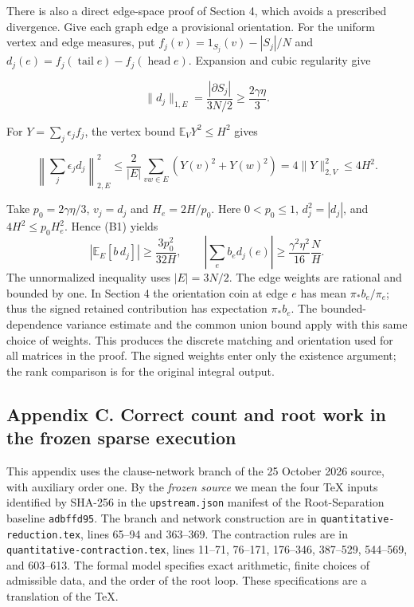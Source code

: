 \documentclass[
  11pt,
]{article}
\begin{document}
There is also a direct edge-space proof of Section 4, which avoids a
prescribed divergence. Give each graph edge a provisional orientation.
For the uniform vertex and edge measures, put
\(f_j(v)=1_{S_j}(v)-|S_j|/N\) and
\(d_j(e)=f_j(\operatorname{tail}e)-f_j(\operatorname{head}e)\).
Expansion and cubic regularity give

\[
\|d_j\|_{1,E}=\frac{|\partial S_j|}{3N/2}\ge\frac{2\gamma\eta}{3}.
\]

For \(Y=\sum_j\epsilon_jf_j\), the vertex bound
\(\mathbb E_VY^2\le H^2\) gives

\[
\left\|\sum_j\epsilon_jd_j\right\|_{2,E}^2
\le\frac{2}{|E|}\sum_{vw\in E}(Y(v)^2+Y(w)^2)
=4\|Y\|_{2,V}^2\le4H^2.
\]

Take \(p_0=2\gamma\eta/3\), \(v_j=d_j\) and \(H_e=2H/p_0\).
Here \(0<p_0\le1\), \(d_j^2=|d_j|\), and
\(4H^2\le p_0 H_e^2\). Hence (B1) yields
\[
 |\mathbb E_E[b\,d_j]|\ge \frac{3p_0^2}{32H},\qquad
 \left|\sum_e b_e d_j(e)\right|\ge
       \frac{\gamma^2\eta^2}{16}\frac{N}{H}.                 \tag{B2}
\]
The unnormalized inequality uses \(|E|=3N/2\). The edge
weights are rational and bounded by one. In Section 4 the orientation
coin at edge \(e\) has mean \(\pi_* b_e/\pi_e\); thus the signed retained
contribution has expectation \(\pi_* b_e\). The bounded-dependence
variance estimate and the common union bound apply with this same
choice of weights. This produces the discrete matching and orientation
used for all matrices in the proof. The signed weights enter only the
existence argument; the rank comparison is for the original integral output.

\clearpage
\subsection{Appendix C. Correct count and root work in the frozen sparse execution}
\label{app:frozen-execution}
\setcounter{equation}{0}
\renewcommand*{\theequation}{C\arabic{equation}}
\renewcommand*{\theHequation}{appendixC.\arabic{equation}}

This appendix uses the clause-network branch of the 25 October 2026
source, with auxiliary order one. By the \emph{frozen source} we mean the
four TeX inputs identified by SHA-256 in the \texttt{upstream.json}
manifest of the Root-Separation baseline \texttt{adbffd95}. The branch and
network construction are in \texttt{quantitative-reduction.tex},
lines 65--94 and 363--369. The contraction rules are in
\texttt{quantitative-contraction.tex}, lines 11--71, 76--171, 176--346,
387--529, 544--569, and 603--613. The formal model specifies exact
arithmetic, finite choices of admissible data, and the order of the
root loop. These specifications are a translation of the TeX.
\end{document}
